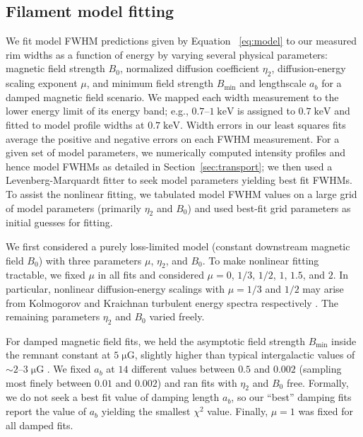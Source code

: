 \documentclass[iop, apj, numberedappendix]{emulateapj}
\newcommand*{\mt}{\mathrm}
\newcommand*{\unit}[1]{\;\mt{#1}}  %
\newcommand*{\abt}{\mathord{\sim}} %
\newcommand*{\Bmin}{B_{\mt{min}}}
\newcommand*{\muG}{\unit{\mu G}}
\begin{document}
\subsection{Filament model fitting}
\label{sec:fits}

We fit model FWHM predictions given by Equation~ \eqref{eq:model} to our
measured rim widths as a function of energy by varying several physical
parameters: magnetic field strength $B_0$, normalized diffusion coefficient
$\eta_2$, diffusion-energy scaling exponent $\mu$, and minimum field strength
$\Bmin$ and lengthscale $a_b$ for a damped magnetic field scenario.  We
mapped each width measurement to the lower energy limit of its energy band;
e.g., $0.7$--$1 \unit{keV}$ is assigned to $0.7 \unit{keV}$ and fitted to model
profile widths at $0.7 \unit{keV}$.  Width errors in our least squares fits
average the positive and negative errors on each FWHM measurement.  For a given
set of model parameters, we numerically computed intensity profiles and
hence model FWHMs as detailed in Section~\ref{sec:transport}; we then used a
Levenberg-Marquardt fitter to seek model parameters yielding best fit FWHMs.
To assist the nonlinear fitting, we tabulated model FWHM values on a large grid
of model parameters (primarily $\eta_2$ and $B_0$) and used best-fit grid
parameters as initial guesses for fitting.

We first considered a purely loss-limited model (constant downstream magnetic
field $B_0$) with three parameters $\mu$, $\eta_2$, and $B_0$.  To make
nonlinear fitting tractable, we fixed $\mu$ in all fits and considered $\mu =
0$, $1/3$, $1/2$, $1$, $1.5$, and $2$.  In particular, nonlinear
diffusion-energy scalings with $\mu = 1/3$ and $1/2$ may arise from Kolmogorov
and Kraichnan turbulent energy spectra respectively \citep{reynolds2004}.  The
remaining parameters $\eta_2$ and $B_0$ varied freely.

For damped magnetic field fits, we held the asymptotic field strength
$\Bmin$ inside the remnant constant at $5 \muG$, slightly higher than
typical intergalactic values of $\abt 2$--$3 \muG$ \citep{lyne1989, han2006}.
We fixed $a_b$ at $14$ different values between $0.5$ and $0.002$ (sampling
most finely between $0.01$ and $0.002$) and ran fits with $\eta_2$ and $B_0$
free.  Formally, we do not seek a best fit value of damping length $a_b$, so
our ``best'' damping fits report the value of $a_b$ yielding the smallest
$\chi^2$ value.  Finally, $\mu = 1$ was fixed for all damped fits.
\end{document}
